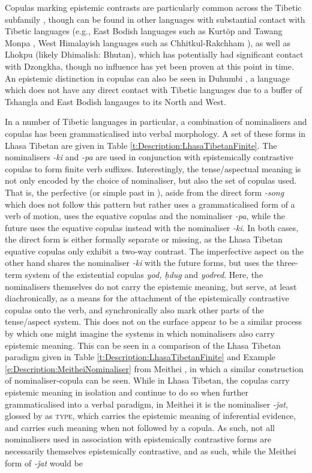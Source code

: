 Copulas marking epistemic contrasts are particularly common across the Tibetic subfamily \cite{Zemp2020}, though can be found in other languages with substantial contact with Tibetic languages (e.g., East Bodish languages such as Kurtöp \cite{Hyslop2020Kurtop} and Tawang Monpa \cite{Tombleson2020}, West Himalayish languages such as Chhitkul-Rakchham \cite{Martinez2021}), as well as Lhokpu (likely Dhimalish: Bhutan), which has potentially had significant contact with Dzongkha, though no influence has yet been proven at this point in time. An epistemic distinction in copulas can also be seen in Duhumbi \cite[Duhumbi: Kho-Bwa,][]{Bodt2020}, a language which does not have any direct contact with Tibetic languages due to a buffer of Tshangla and East Bodish langauges to its North and West.

In a number of Tibetic languages in particular, a combination of nominalisers and copulas has been grammaticalised into verbal morphology. A set of these forms in Lhasa Tibetan are given in Table \ref{t:Description:LhasaTibetanFinite}. The nominalisers \textit{-ki} and \textit{-pa} are used in conjunction with epistemically contrastive copulas to form finite verb suffixes. Interestingly, the tense/aspectual meaning is not only encoded by the choice of nominaliser, but also the set of copulas used. That is, the perfective (or simple past in ), aside from the direct form \textit{-song} which does not follow this pattern but rather uses a grammaticalised form of a verb of motion, uses the equative copulas and the nominaliser \textit{-pa}, while the future uses the equative copulas instead with the nominaliser \textit{-ki}. In both cases, the direct form is either formally separate or missing, as the Lhasa Tibetan equative copulas only exhibit a two-way contrast. The imperfective aspect on the other hand shares the nominaliser \textit{-ki} with the future forms, but uses the three-term system of the existential copulas \textit{yod, ḥdug} and \textit{yodred}. Here, the nominalisers themselves do not carry the epistemic meaning, but serve, at least diachronically, as a means for the attachment of the epistemically contrastive copulas onto the verb, and synchronically also mark other parts of the tense/aspect system. This does not on the surface appear to be a similar process by which one might imagine the systems in which nominalisers also carry epistemic meaning. This can be seen in a comparison of the Lhasa Tibetan paradigm given in Table \ref{t:Description:LhasaTibetanFinite} and Example \ref{e:Description:MeitheiNominaliser} from Meithei \cite[Internal Isolate: India,][296]{Chelliah1997}, in which a similar construction of nominaliser-copula can be seen. While in Lhasa Tibetan, the copulas carry epistemic meaning in isolation and continue to do so when further grammaticalised into a verbal paradigm, in Meithei it is the nominaliser \textit{-ǰat}, glossed by  as \textsc{type}, which carries the epistemic meaning of inferential evidence, and carries such meaning when not followed by a copula. As such, not all nominalisers used in association with epistemically contrastive forms are necessarily themselves epistemically contrastive, and as such, while the Meithei form of \textit{-ǰat} would be 